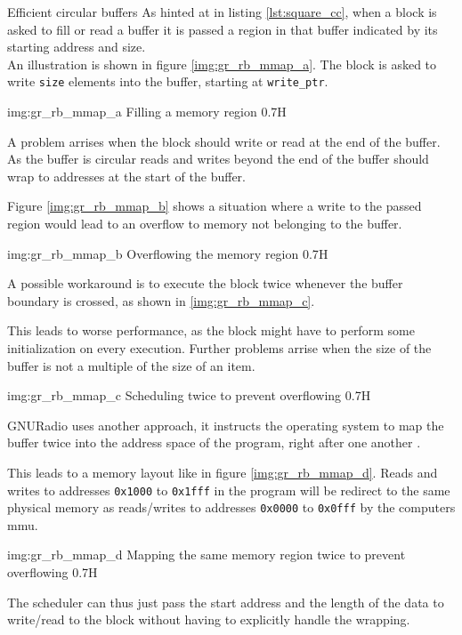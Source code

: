 \begin{subchapter}{Efficient circular buffers}
  As hinted at in listing \ref{lst:square_cc}, when a block
  is asked to fill or read a buffer it is passed a region in
  that buffer indicated by its starting address and size. \\

  An illustration is shown in figure \ref{img:gr_rb_mmap_a}.
  The block is asked to write \texttt{size} elements into
  the buffer, starting at \texttt{write\_ptr}.

               {img:gr_rb_mmap_a}
               {Filling a memory region}
               {0.7}{H}

  A problem arrises when the block should write or read
  at the end of the buffer.
  As the buffer is circular reads and writes beyond the
  end of the buffer should wrap to addresses at the start of the
  buffer.

  Figure \ref{img:gr_rb_mmap_b} shows a situation where
  a write to the passed region would lead to an overflow
  to memory not belonging to the buffer.

               {img:gr_rb_mmap_b}
               {Overflowing the memory region}
               {0.7}{H}

  A possible workaround is to execute the block
  twice whenever the buffer boundary is crossed,
  as shown in \ref{img:gr_rb_mmap_c}.

  This leads to worse performance, as the block might have
  to perform some initialization on every execution.
  Further problems arrise when the size of the buffer is not
  a multiple of the size of an item.

               {img:gr_rb_mmap_c}
               {Scheduling twice to prevent overflowing}
               {0.7}{H}

  GNURadio uses another approach, it instructs the operating system
  to map the buffer twice into the address space of the program,
  right after one another \cite{grrdbufmmap}.

  This leads to a memory layout like in figure \ref{img:gr_rb_mmap_d}.
  Reads and writes to addresses \texttt{0x1000} to \texttt{0x1fff} in the program
  will be redirect to the same physical memory as reads/writes to addresses
  \texttt{0x0000} to \texttt{0x0fff} by the computers \gls{mmu}.

               {img:gr_rb_mmap_d}
               {Mapping the same memory region twice to prevent overflowing}
               {0.7}{H}

  The scheduler can thus just pass the start address and the length of
  the data to write/read to the block without having to explicitly handle
  the wrapping.
\end{subchapter}
